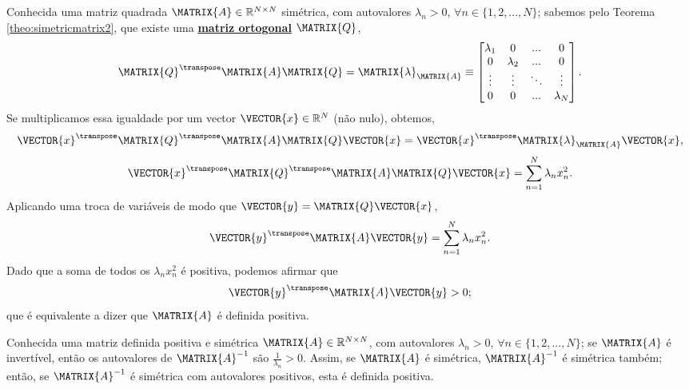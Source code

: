 \begin{myproofT}\label{proof:theo:positivematrix2}
Conhecida uma matriz quadrada $\MATRIX{A} \in \mathbb{R}^{N \times N}$ simétrica,
com  autovalores $\lambda_n>0$, $\forall n \in \{1, 2, ..., N\}$;
sabemos pelo Teorema \ref{theo:simetricmatrix2}, 
que existe uma \hyperref[def:ortogonalmatrix0]{\textbf{matriz ortogonal}} $\MATRIX{Q}$,
\begin{equation}
\MATRIX{Q}^{\transpose}\MATRIX{A}\MATRIX{Q} = \MATRIX{\lambda}_{\MATRIX{A}}\equiv
\begin{bmatrix}
\lambda_1 & 0         & ...    & 0 \\
0         & \lambda_2 & ...    & 0 \\
\vdots    & \vdots    & \ddots & \vdots \\
0         & 0         & ...    & \lambda_N
\end{bmatrix}.
\end{equation}
Se multiplicamos essa igualdade por um vector $\VECTOR{x} \in \mathbb{R}^N$ (não nulo), obtemos,
\begin{equation}
\VECTOR{x}^{\transpose} \MATRIX{Q}^{\transpose}\MATRIX{A}\MATRIX{Q} \VECTOR{x} = 
\VECTOR{x}^{\transpose} \MATRIX{\lambda}_{\MATRIX{A}} \VECTOR{x},
\end{equation}
\begin{equation}
\VECTOR{x}^{\transpose} \MATRIX{Q}^{\transpose}\MATRIX{A}\MATRIX{Q} \VECTOR{x} 
= \sum \limits_{n=1}^{N}\lambda_n x_n^2.
\end{equation}
Aplicando uma troca de variáveis de modo que $\VECTOR{y}=\MATRIX{Q} \VECTOR{x}$,
\begin{equation}
\VECTOR{y}^{\transpose} \MATRIX{A} \VECTOR{y} 
= \sum \limits_{n=1}^{N}\lambda_n x_n^2.
\end{equation}
Dado que a soma de todos os $\lambda_n x_n^2$ é positiva, podemos afirmar que
\begin{equation}
\VECTOR{y}^{\transpose} \MATRIX{A} \VECTOR{y} > 0;
\end{equation}
que é equivalente a dizer que $\MATRIX{A}$ é definida positiva.
\end{myproofT}

\begin{myproofT}\label{proof:theo:positivematrix:2}
Conhecida uma matriz definida positiva e simétrica $\MATRIX{A} \in \mathbb{R}^{N \times N}$,
com  autovalores $\lambda_n>0$, $\forall n \in \{1, 2, ..., N\}$;
se $\MATRIX{A}$  é invertível, então os autovalores de $\MATRIX{A}^{-1}$ são  $\frac{1}{\lambda_n}>0$.
Assim, se $\MATRIX{A}$ é simétrica, $\MATRIX{A}^{-1}$ é simétrica também;
então, se $\MATRIX{A}^{-1}$ é simétrica com autovalores positivos, esta é definida positiva.
\end{myproofT}

